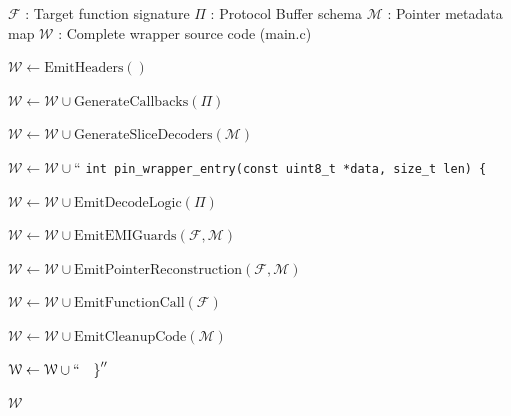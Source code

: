 \begin{algorithm}[H]
\caption{Nanopb Wrapper with Pointer Reconstruction}
\label{alg:wrapper_reconstruction}
\begin{algorithmic}[1]
\REQUIRE $\mathcal{F}$ : Target function signature
\REQUIRE $\Pi$ : Protocol Buffer schema
\REQUIRE $\mathcal{M}$ : Pointer metadata map
\ENSURE $\mathcal{W}$ : Complete wrapper source code (main.c)

    \STATE $\mathcal{W} \leftarrow \text{EmitHeaders}()$ 

    \STATE {}
    \STATE $\mathcal{W} \leftarrow \mathcal{W} \cup \text{GenerateCallbacks}(\Pi)$

    \STATE {}
    \STATE $\mathcal{W} \leftarrow \mathcal{W} \cup \text{GenerateSliceDecoders}(\mathcal{M})$

    \STATE {}
    \STATE $\mathcal{W} \leftarrow \mathcal{W} \cup \text{``}$
    \STATE \quad \texttt{int pin\_wrapper\_entry(const uint8\_t *data, size\_t len) \{}

    \STATE {}
    \STATE $\mathcal{W} \leftarrow \mathcal{W} \cup \text{EmitDecodeLogic}(\Pi)$

    \STATE {}
    \STATE $\mathcal{W} \leftarrow \mathcal{W} \cup \text{EmitEMIGuards}(\mathcal{F}, \mathcal{M})$

    \STATE {}
    \STATE $\mathcal{W} \leftarrow \mathcal{W} \cup \text{EmitPointerReconstruction}(\mathcal{F}, \mathcal{M})$

    \STATE {}
    \STATE $\mathcal{W} \leftarrow \mathcal{W} \cup \text{EmitFunctionCall}(\mathcal{F})$

    \STATE {}
    \STATE $\mathcal{W} \leftarrow \mathcal{W} \cup \text{EmitCleanupCode}(\mathcal{M})$

    \STATE $\mathcal{W} \leftarrow \mathcal{W} \cup \text{``\quad \}}''$ 

    \RETURN $\mathcal{W}$
\ENDPROCEDURE

\vspace{0.3cm}


\end{algorithmic}
\end{algorithm}
